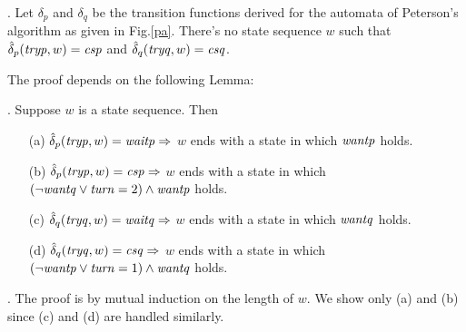 \documentclass[12pt]{article}
\newcommand{\tid}[1]{\mbox{\tt #1\/}}
\newcommand{\id}[1]{\mbox{\it #1\/}}
\begin{document}


\vspace{1em}
.
Let $\delta_p$ and $\delta_q$ be the transition functions derived for the automata
of Peterson's algorithm as given in Fig.\ref{pa}.
There's no state sequence $w$ such that $\hat{\delta}_p(\id{tryp},w)=\id{csp}$ and
$\hat{\delta}_q(\id{tryq},w)=\id{csq}$.

\vspace{1em}
\noindent The proof depends on the following Lemma:

\vspace{1em}
.
Suppose $w$ is a state sequence.  Then
\begin{enumerate}
\item[(a)] $\hat{\delta}_p(\id{tryp},w)=\id{waitp}\Rightarrow$ $w$ ends with a
state in which $\id{wantp}$ holds.
\item[(b)] $\hat{\delta}_p(\id{tryp},w)=\id{csp}\Rightarrow$ $w$ ends with a
state in which $(\neg\id{wantq}\vee\id{turn}=2)\wedge\id{wantp}$ holds.

\item[(c)] $\hat{\delta}_q(\id{tryq},w)=\id{waitq}\Rightarrow$ $w$ ends with a
state in which $\id{wantq}$ holds.
\item[(d)] $\hat{\delta}_q(\id{tryq},w)=\id{csq}\Rightarrow$ $w$ ends with 
a state in which $(\neg\id{wantp}\vee\id{turn}=1)\wedge\id{wantq}$ holds.
\end{enumerate}

\vspace{1em}
.  The proof is by mutual induction on the length of $w$.
We show only (a) and (b) since (c) and (d) are handled similarly.
\end{document}

